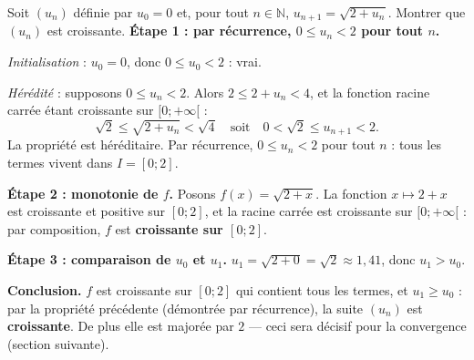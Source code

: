 \documentclass[11pt]{article}
\begin{document}
\begin{exoresolu}[La suite $u_{n+1} = \sqrt{2 + u_n}$, $u_0 = 0$]
Soit $(u_n)$ définie par $u_0 = 0$ et, pour tout $n \in \mathbb{N}$, $u_{n+1} = \sqrt{2 + u_n}$. Montrer que $(u_n)$ est croissante.
\tcblower
\textbf{Étape 1 : par récurrence, $0 \leq u_n < 2$ pour tout $n$.}

\emph{Initialisation} : $u_0 = 0$, donc $0 \leq u_0 < 2$ : vrai.

\emph{Hérédité} : supposons $0 \leq u_n < 2$. Alors $2 \leq 2 + u_n < 4$, et la fonction racine carrée étant croissante sur $[0;+\infty[$ :
\[ \sqrt{2} \leq \sqrt{2+u_n} < \sqrt{4} \quad \text{soit} \quad 0 < \sqrt{2} \leq u_{n+1} < 2. \]
La propriété est héréditaire. Par récurrence, $0 \leq u_n < 2$ pour tout $n$ : tous les termes vivent dans $I = [0;2]$.

\textbf{Étape 2 : monotonie de $f$.} Posons $f(x) = \sqrt{2+x}$. La fonction $x \mapsto 2+x$ est croissante et positive sur $[0;2]$, et la racine carrée est croissante sur $[0;+\infty[$ : par composition, $f$ est \textbf{croissante sur $[0;2]$}.

\textbf{Étape 3 : comparaison de $u_0$ et $u_1$.} $u_1 = \sqrt{2+0} = \sqrt{2} \approx 1{,}41$, donc $u_1 > u_0$.

\textbf{Conclusion.} $f$ est croissante sur $[0;2]$ qui contient tous les termes, et $u_1 \geq u_0$ : par la propriété précédente (démontrée par récurrence), la suite $(u_n)$ est \textbf{croissante}. De plus elle est majorée par $2$ — ceci sera décisif pour la convergence (section suivante).
\end{exoresolu}
\end{document}
